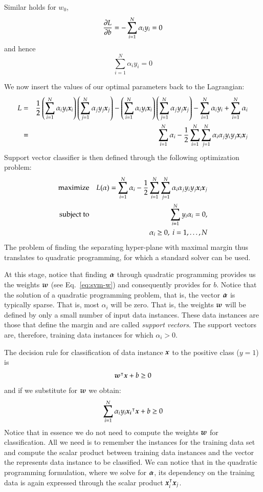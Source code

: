 \begin{refsection}
Similar holds for $w_0$,
$$ \frac{\partial L}{\partial b}=-\sum_{i=1}^N \alpha_i y_i = 0 $$
and hence
$$ \sum_{i=1}^N \alpha_i y_i = 0 $$

We now insert the values of our optimal parameters back to the Lagrangian:
\begin{eqnarray*}
L & = & {1\over 2} \left(\sum_{i=1}^N \alpha_i y_i \boldsymbol{x}_i \right) \left(\sum_{j=1}^N \alpha_j y_j \boldsymbol{x}_j \right) - \left(\sum_{i=1}^N \alpha_i y_i \boldsymbol{x}_i \right) \left(\sum_{j=1}^N \alpha_j y_j \boldsymbol{x}_j \right) - \sum_{i=1}^N \alpha_i y_i + \sum_{i=1}^N \alpha_i \\
& = & \sum_{i=1}^N \alpha_i - {1\over 2}\sum_{i=1}^N\sum_{j=1}^N \alpha_i\alpha_j y_i y_j \boldsymbol{x}_i\boldsymbol{x}_j
\end{eqnarray*}
Support vector classifier is then defined through the following optimization problem:
\begin{eqnarray*}
{\rm maximize} && L(\alpha) = \sum_{i=1}^N \alpha_i - {1\over 2}\sum_{i=1}^N\sum_{j=1}^N \alpha_i\alpha_j y_i y_j \boldsymbol{x}_i\boldsymbol{x}_j \\
{\rm subject\ to} && \sum_{i=1}^N y_i\alpha_i = 0, \\
&& \alpha_i\geq 0,\ i=1,\ldots, N
\end{eqnarray*}
The problem of finding the separating hyper-plane with maximal margin thus translates to quadratic programming, for which a standard solver can be used.

At this stage, notice that finding $\boldsymbol{\alpha}$ through quadratic programming provides us the weights $\boldsymbol{w}$ (see Eq.~\ref{eq:svm-w}) and consequently provides for $b$. Notice that the solution of a quadratic programming problem, that is, the vector $\boldsymbol{\alpha}$ is typically sparse. That is, most $\alpha_i$ will be zero. That is, the weights $\boldsymbol{w}$ will be defined by only a small number of input data instances. These data instances are those that define the margin and are called {\em support vectors}. The support vectors are, therefore, training data instances for which $\alpha_i>0$.

The decision rule for classification of data instance $\boldsymbol{x}$ to the positive class ($y=1$) is
$$ \boldsymbol{w}^\intercal\boldsymbol{x}+b\geq0 $$
and if we substitute for $\boldsymbol{w}$ we obtain:
$$ \sum_{i=1}^N \alpha_i y_i\boldsymbol{x_i}^\intercal \boldsymbol{x} + b \geq 0 $$
Notice that in essence we do not need to compute the weights $\boldsymbol{w}$ for classification. All we need is to remember the instances for the training data set and compute the scalar product between training data instances and the vector the represents data instance to be classified. We can notice that in the quadratic programming formulation, where we solve for $\boldsymbol{\alpha}$, its dependency on the training data is again expressed through the scalar product $\boldsymbol{x}_i^\intercal\boldsymbol{x}_j$.


\end{refsection}
